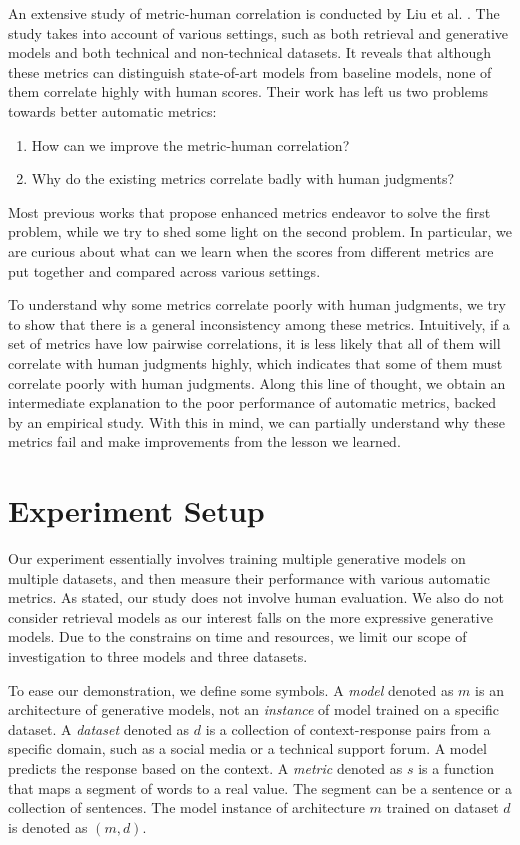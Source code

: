 \documentclass[runningheads]{llncs}
\begin{document}
    An extensive study of metric-human correlation is conducted by Liu et al. \cite{HowNot}. The study takes into account of various settings, such as both retrieval and generative models and both technical and non-technical datasets. It reveals that although these metrics can distinguish state-of-art models from baseline models, none of them correlate highly with human scores. Their work has left us two problems towards better automatic metrics:
    \begin{enumerate}
        \item How can we improve the metric-human correlation?
        \item Why do the existing metrics correlate badly with human judgments?
    \end{enumerate}
    Most previous works that propose enhanced metrics endeavor to solve the first problem, while we try to shed some light on the second problem. In particular, we are curious about what can we learn when the scores from different metrics are put together and compared across various settings.

    To understand why some metrics correlate poorly with human judgments, we try to show that there is a general inconsistency among these metrics. Intuitively, if a set of metrics have low pairwise correlations, it is less likely that all of them will correlate with human judgments highly, which indicates that some of them must correlate poorly with human judgments. Along this line of thought, we obtain an intermediate explanation to the poor performance of automatic metrics, backed by an empirical study. With this in mind, we can partially understand why these metrics fail and make improvements from the lesson we learned.

    \section{Experiment Setup}
    Our experiment essentially involves training multiple generative models on multiple datasets, and then measure their performance with various automatic metrics. As stated, our study does not involve human evaluation. We also do not consider retrieval models as our interest falls on the more expressive generative models. Due to the constrains on time and resources, we limit our scope of investigation to three models and three datasets.

    To ease our demonstration, we define some symbols. A \emph{model} denoted as $m$ is an architecture of generative models, not an \emph{instance} of model trained on a specific dataset. A \emph{dataset} denoted as $d$ is a collection of context-response pairs from a specific domain, such as a social media or a technical support forum. A model predicts the response based on the context. A \emph{metric} denoted as $s$ is a function that maps a segment of words to a real value. The segment can be a sentence or a collection of sentences. The model instance of architecture $m$ trained on dataset $d$ is denoted as $(m, d)$.
\end{document}
